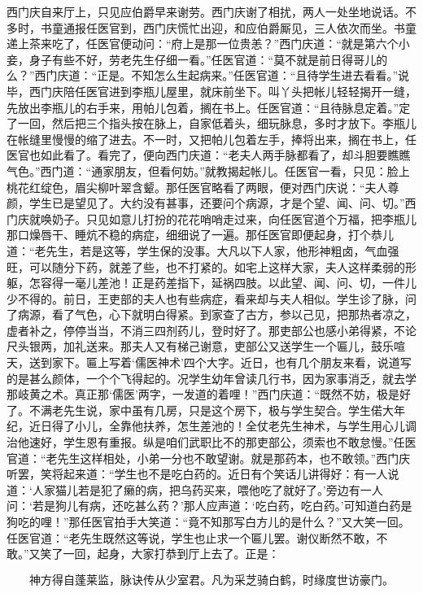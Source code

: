 西门庆自来厅上，只见应伯爵早来谢劳。西门庆谢了相扰，两人一处坐地说话。不多时，书童通报任医官到，西门庆慌忙出迎，和应伯爵厮见，三人依次而坐。书童递上茶来吃了，任医官便动问：“府上是那一位贵恙？”西门庆道：“就是第六个小妾，身子有些不好，劳老先生仔细一看。”任医官道：“莫不就是前日得哥儿的么？”西门庆道：“正是。不知怎么生起病来。”任医官道：“且待学生进去看看。”说毕，西门庆陪任医官进到李瓶儿屋里，就床前坐下。叫丫头把帐儿轻轻揭开一缝，先放出李瓶儿的右手来，用帕儿包着，搁在书上。任医官道：“且待脉息定着。”定了一回，然后把三个指头按在脉上，自家低着头，细玩脉息，多时才放下。李瓶儿在帐缝里慢慢的缩了进去。不一时，又把帕儿包着左手，捧将出来，搁在书上，任医官也如此看了。看完了，便向西门庆道：“老夫人两手脉都看了，却斗胆要瞧瞧气色。”西门道：“通家朋友，但看何妨。”就教揭起帐儿。任医官一看，只见：脸上桃花红绽色，眉尖柳叶翠含颦。那任医官略看了两眼，便对西门庆说：“夫人尊颜，学生已是望见了。大约没有甚事，还要问个病源，才是个望、闻、问、切。”西门庆就唤奶子。只见如意儿打扮的花花哨哨走过来，向任医官道个万福，把李瓶儿那口燥唇干、睡炕不稳的病症，细细说了一遍。那任医官即便起身，打个恭儿道：“老先生，若是这等，学生保的没事。大凡以下人家，他形神粗卤，气血强旺，可以随分下药，就差了些，也不打紧的。如宅上这样大家，夫人这样柔弱的形躯，怎容得一毫儿差池！正是药差指下，延祸四肢。以此望、闻、问、切，一件儿少不得的。前日，王吏部的夫人也有些病症，看来却与夫人相似。学生诊了脉，问了病源，看了气色，心下就明白得紧。到家查了古方，参以己见，把那热者凉之，虚者补之，停停当当，不消三四剂药儿，登时好了。那吏部公也感小弟得紧，不论尺头银两，加礼送来。那夫人又有梯己谢意，吏部公又送学生一个匾儿，鼓乐喧天，送到家下。匾上写着‘儒医神术’四个大字。近日，也有几个朋友来看，说道写的是甚么颜体，一个个飞得起的。况学生幼年曾读几行书，因为家事消乏，就去学那岐黄之术。真正那‘儒医’两字，一发道的着哩！”西门庆道：“既然不妨，极是好了。不满老先生说，家中虽有几房，只是这个房下，极与学生契合。学生偌大年纪，近日得了小儿，全靠他扶养，怎生差池的！全仗老先生神术，与学生用心儿调治他速好，学生恩有重报。纵是咱们武职比不的那吏部公，须索也不敢怠慢。”任医官道：“老先生这样相处，小弟一分也不敢望谢。就是那药本，也不敢领。”西门庆听罢，笑将起来道：“学生也不是吃白药的。近日有个笑话儿讲得好：有一人说道：‘人家猫儿若是犯了癞的病，把乌药买来，喂他吃了就好了。’旁边有一人问：‘若是狗儿有病，还吃甚么药？’那人应声道：‘吃白药，吃白药。’可知道白药是狗吃的哩！”那任医官拍手大笑道：“竟不知那写白方儿的是什么？”又大笑一回。任医官道：“老先生既然这等说，学生也止求一个匾儿罢。谢仪断然不敢，不敢。”又笑了一回，起身，大家打恭到厅上去了。正是：

\[
神方得自蓬莱监，脉诀传从少室君。
凡为采芝骑白鹤，时缘度世访豪门。
\]
